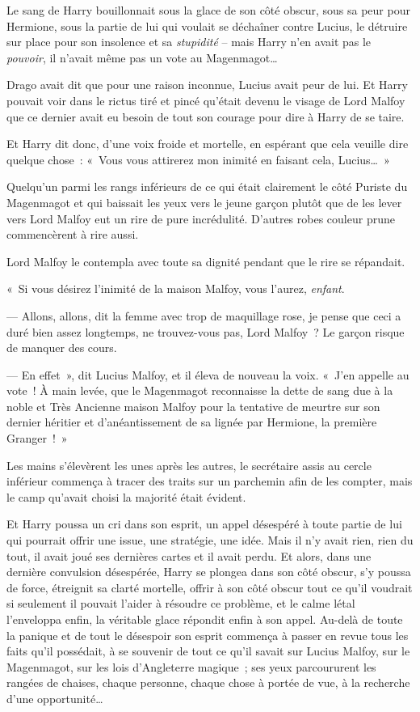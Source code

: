 \later

Le sang de Harry bouillonnait sous la glace de son côté obscur, sous sa peur pour Hermione, sous la partie de lui qui voulait se déchaîner contre Lucius, le détruire sur place pour son insolence et sa \emph{stupidité} -- mais Harry n'en avait pas le \emph{pouvoir}, il n'avait même pas un vote au Magenmagot…

Drago avait dit que pour une raison inconnue, Lucius avait peur de lui. Et Harry pouvait voir dans le rictus tiré et pincé qu'était devenu le visage de Lord Malfoy que ce dernier avait eu besoin de tout son courage pour dire à Harry de se taire.

Et Harry dit donc, d'une voix froide et mortelle, en espérant que cela veuille dire quelque chose~: «~Vous vous attirerez mon inimité en faisant cela, Lucius…~»

Quelqu'un parmi les rangs inférieurs de ce qui était clairement le côté Puriste du Magenmagot et qui baissait les yeux vers le jeune garçon plutôt que de les lever vers Lord Malfoy eut un rire de pure incrédulité. D'autres robes couleur prune commencèrent à rire aussi.

Lord Malfoy le contempla avec toute sa dignité pendant que le rire se répandait.

«~Si vous désirez l'inimité de la maison Malfoy, vous l'aurez, \emph{enfant}.

--- Allons, allons, dit la femme avec trop de maquillage rose, je pense que ceci a duré bien assez longtemps, ne trouvez-vous pas, Lord Malfoy~? Le garçon risque de manquer des cours.

--- En effet~», dit Lucius Malfoy, et il éleva de nouveau la voix. «~J'en appelle au vote~! À main levée, que le Magenmagot reconnaisse la dette de sang due à la noble et Très Ancienne maison Malfoy pour la tentative de meurtre sur son dernier héritier et d'anéantissement de sa lignée par Hermione, la première Granger~!~»

Les mains s'élevèrent les unes après les autres, le secrétaire assis au cercle inférieur commença à tracer des traits sur un parchemin afin de les compter, mais le camp qu'avait choisi la majorité était évident.

Et Harry poussa un cri dans son esprit, un appel désespéré à toute partie de lui qui pourrait offrir une issue, une stratégie, une idée. Mais il n'y avait rien, rien du tout, il avait joué ses dernières cartes et il avait perdu. Et alors, dans une dernière convulsion désespérée, Harry se plongea dans son côté obscur, s'y poussa de force, étreignit sa clarté mortelle, offrir à son côté obscur tout ce qu'il voudrait si seulement il pouvait l'aider à résoudre ce problème, et le calme létal l'enveloppa enfin, la véritable glace répondit enfin à son appel. Au-delà de toute la panique et de tout le désespoir son esprit commença à passer en revue tous les faits qu'il possédait, à se souvenir de tout ce qu'il savait sur Lucius Malfoy, sur le Magenmagot, sur les lois d'Angleterre magique~; ses yeux parcoururent les rangées de chaises, chaque personne, chaque chose à portée de vue, à la recherche d'une opportunité…
